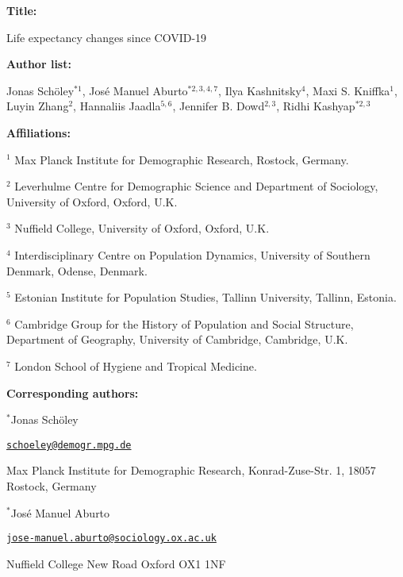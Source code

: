 \documentclass[12pt]{article}
\begin{document}
\begin{titlepage}


{\textbf{Title:}\par
Life expectancy changes since COVID-19
\par\medskip}

{\textbf{Author list:}\par
Jonas Schöley$^{*1}$,
José Manuel Aburto$^{*2,3,4,7}$,
Ilya Kashnitsky$^{4}$,
Maxi S. Kniffka$^1$,
Luyin Zhang$^2$,
Hannaliis Jaadla$^{5,6}$,
Jennifer B. Dowd$^{2,3}$,
Ridhi Kashyap$^{*2,3}$
\par\medskip}

{\textbf{Affiliations:}\par
$^1$ Max Planck Institute for Demographic Research, Rostock, Germany.\par
$^2$ Leverhulme Centre for Demographic Science and Department of Sociology, University of Oxford, Oxford, U.K.\par
$^3$ Nuffield College, University of Oxford, Oxford, U.K.\par
$^4$ Interdisciplinary Centre on Population Dynamics, University of Southern Denmark, Odense, Denmark.\par
$^5$ Estonian Institute for Population Studies, Tallinn University, Tallinn, Estonia.\par
$^6$ Cambridge Group for the History of Population and Social Structure, Department of Geography, University of Cambridge, Cambridge, U.K.\par
$^7$ London School of Hygiene and Tropical Medicine.\par
\par\medskip}

{\textbf{Corresponding authors:}\par

$^{*}$Jonas Schöley

\href{mailto:schoeley@demogr.mpg.de}{\texttt{schoeley@demogr.mpg.de}}

Max Planck Institute for Demographic Research,
Konrad-Zuse-Str. 1,
18057 Rostock, Germany


\vspace{1em}

$^{*}$José Manuel Aburto

\href{mailto:jose-manuel.aburto@sociology.ox.ac.uk}{\texttt{jose-manuel.aburto@sociology.ox.ac.uk}}

Nuffield College
New Road
Oxford OX1 1NF

}
\end{titlepage}
\end{document}
